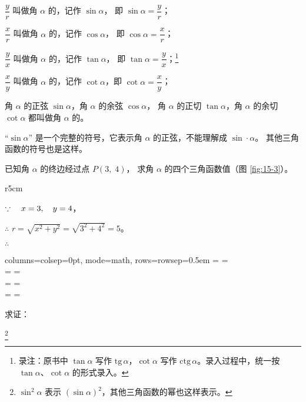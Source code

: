 \begin{enhancedline}
$\dfrac{y}{r}$ 叫做角 $\alpha$ 的，记作 $\sin\alpha$， 即 $\sin\alpha = \dfrac{y}{r}$；

$\dfrac{x}{r}$ 叫做角 $\alpha$ 的，记作 $\cos\alpha$， 即 $\cos\alpha = \dfrac{x}{r}$；

$\dfrac{y}{x}$ 叫做角 $\alpha$ 的，记作 $\tan\alpha$， 即 $\tan\alpha = \dfrac{y}{x}$；\footnote{
    录注：原书中 $\tan\alpha$ 写作 $\text{tg}\,\alpha$，$\cot\alpha$ 写作 $\text{ctg}\,\alpha$。录入过程中，统一按 $\tan\alpha$、$\cot\alpha$ 的形式录入。
}

$\dfrac{x}{y}$ 叫做角 $\alpha$ 的，记作 $\cot\alpha$，\footnotemark 即 $\cot\alpha = \dfrac{x}{y}$；


角 $\alpha$ 的正弦 $\sin\alpha$，角 $\alpha$ 的余弦 $\cos\alpha$，
角 $\alpha$ 的正切 $\tan\alpha$，角 $\alpha$ 的余切 $\cot\alpha$
都叫做角 $\alpha$ 的。

\zhuyi “$\sin\alpha$” 是一个完整的符号，它表示角 $\alpha$ 的正弦，不能理解成 $\sin \cdot \alpha$。
其他三角函数的符号也是这样。


\liti 已知角 $\alpha$ 的终边经过点 $P(3,\; 4)$， 求角 $\alpha$ 的四个三角函数值（图 \ref{fig:15-3}）。

\begin{wrapfigure}[9]{r}{5cm}
    \centering
    
    \caption{}\label{fig:15-3}
\end{wrapfigure}


\jie $\because \quad x = 3,\quad y = 4$，

$\therefore$ \quad $r = \sqrt{x^2 + y^2} = \sqrt{3^2 + 4^2} = 5$。

$\therefore$ \quad \begin{tblr}[t]{columns={colsep=0pt, mode=math}, rows={rowsep=0.5em}}
    \sin\alpha =  =  \douhao \\
    \cos\alpha =  =  \douhao \\
    \tan\alpha =  =  \douhao \\
    \cot\alpha =  =  \juhao \\
\end{tblr}


\liti 求证：
\begin{xiaoxiaotis}

     \quad
    \footnote{$\sin^2\alpha$ 表示 $(\sin\alpha)^2$，其他三角函数的幂也这样表示。}


\end{xiaoxiaotis}
\end{enhancedline}
